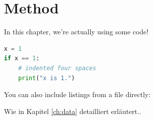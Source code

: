 \chapter{Method}\label{ch:method}

In this chapter, we're actually using some code!

\begin{lstlisting}[language=Python,caption={This is an example of inline listing},captionpos=b]
x = 1
if x == 1:
    # indented four spaces
    print("x is 1.")

\end{lstlisting}

You can also include listings from a file directly:



Wie in Kapitel \ref{ch:data} detailliert erläutert.. 